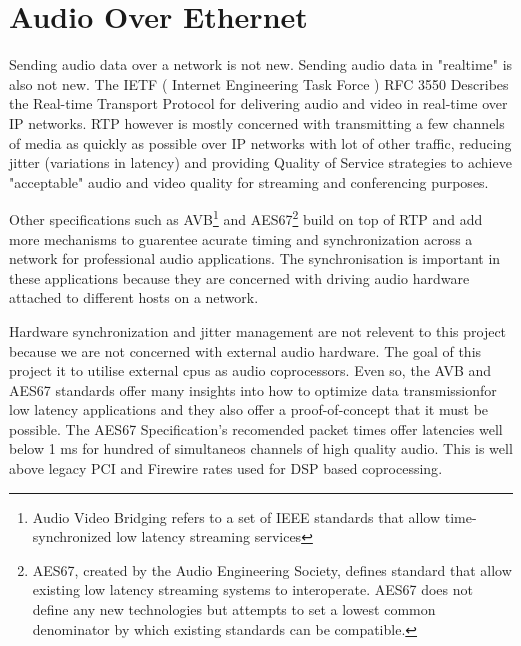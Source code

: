 \section{Audio Over Ethernet}

Sending audio data over a network is not new. Sending audio data in "realtime" is also not new. The IETF ( Internet Engineering Task Force ) RFC 3550 Describes the Real-time Transport Protocol for delivering audio and video in real-time over IP networks. RTP however is mostly concerned with transmitting a few channels of media as quickly as possible over IP networks with lot of other traffic, reducing jitter (variations in latency) and providing Quality of Service strategies to achieve "acceptable" audio and video quality for streaming and conferencing purposes.

Other specifications such as AVB\footnote{Audio Video Bridging refers to a set of IEEE standards that allow time-synchronized low latency streaming services } and AES67\footnote{AES67, created by the Audio Engineering Society, defines standard that allow existing low latency streaming systems to interoperate. AES67 does not define any new technologies but attempts to set a lowest common denominator by which existing standards can be compatible. } build on top of RTP and add more mechanisms to guarentee acurate timing and synchronization across a network for professional audio applications. The synchronisation is important in these applications because they are concerned with driving audio hardware attached to different hosts on a network.

Hardware synchronization and jitter management are not relevent to this project because we are not concerned with external audio hardware. The goal of this project it to utilise external cpus as audio coprocessors. Even so, the AVB and AES67 standards offer many insights into how to optimize data transmissionfor low latency applications and they also offer a proof-of-concept that it must be possible. The AES67 Specification's recomended packet times offer latencies well below 1 ms for hundred of simultaneos channels of high quality audio. This is well above legacy PCI and Firewire rates used for DSP based coprocessing\cite{bouillot2009aes}.
